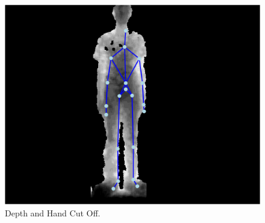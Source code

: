 \begin{figure}[h]
\begin{center}
\includegraphics[scale=0.4]{./design/parse3} 
\end{center}
\caption{Depth and Hand Cut Off.}
\label{fig:depth and hand cut off}
\end{figure}